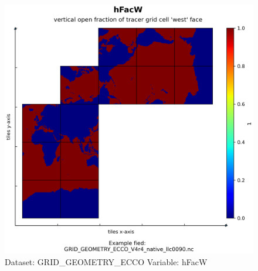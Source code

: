 \begin{figure}[H]
\centering
\includegraphics[width=\textwidth]{../images/plots/native_plots_coords/Geometry_Parameters_for_the_Lat-Lon-Cap_90_(llc90)_Native_Model_Grid_(Version_4_Release_4)/hFacW.png}
\caption{Dataset: GRID\_GEOMETRY\_ECCO Variable: hFacW}
\label{tab:table-GRID_GEOMETRY_ECCO_hFacW-Plot}
\end{figure}
\pagebreak
